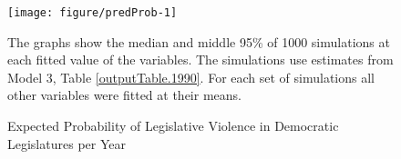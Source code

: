 \documentclass[a4paper]{article}\usepackage[]{graphicx}\usepackage[]{color}
\newenvironment{knitrout}{}{} %
\begin{document}
\begin{figure}[t]
    \begin{center}

\begin{knitrout}
\color{fgcolor}
\texttt{[image: figure/predProb-1]} 

\end{knitrout}
    \end{center}
    \caption{Expected Probability of Legislative Violence in Democratic Legislatures per Year}
    \label{pred_prob}
    \begin{singlespace}
      {\scriptsize{The graphs show the median and middle 95\% of 1000 simulations at each fitted value of the variables. The simulations use estimates from Model 3, Table \ref{outputTable.1990}. For each set of simulations all other variables were fitted at their means.}}
    \end{singlespace}
\end{figure}
\end{document}
